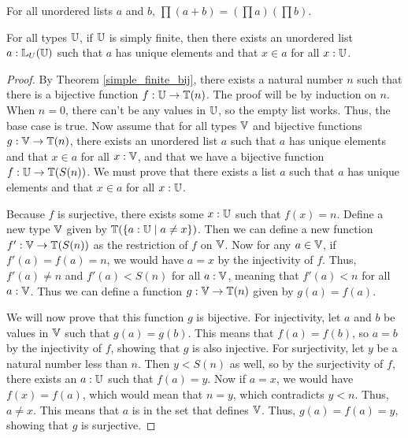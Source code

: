 \documentclass[../math.tex]{subfiles}
\begin{document}
\begin{theorem} \label{ulist_prod_conc}
    For all unordered lists $a$ and $b$, $\prod (a + b) = (\prod a) (\prod b)$.
\end{theorem}

\begin{theorem} \label{ulist_finite}
    For all types $\mathbb{U}$, if $\mathbb{U}$ is simply finite, then there exists an unordered
    list $a : \mathbb{L}_U(\mathbb{U})$ such that $a$ has unique elements and that $x \in a$ for
    all $x : \mathbb{U}$.
\end{theorem}
\begin{proof}
    By Theorem \ref{simple_finite_bij}, there exists a natural number $n$ such
    that there is a bijective function $f : \mathbb{U} \to \mathbb{T}(n)$.  The proof will be by
    induction on $n$.  When $n = 0$, there can't be any values in $\mathbb{U}$, so the
    empty list works.  Thus, the base case is true.  Now assume that for all
    types $\mathbb{V}$ and bijective functions $g : \mathbb{V} \to \mathbb{T}(n)$, there exists an
    unordered list $a$ such that $a$ has unique elements and that $x \in a$ for
    all $x : \mathbb{V}$, and that we have a bijective function $f : \mathbb{U} \to \mathbb{T}(S(n))$.
    We must prove that there exists a list $a$ such that $a$ has unique elements
    and that $x \in a$ for all $x : \mathbb{U}$.

    Because $f$ is surjective, there exists some $x : \mathbb{U}$ such that $f(x) = n$.
    Define a new type $\mathbb{V}$ given by $\mathbb{T}(\{a : \mathbb{U} \mid a \neq x\})$.  Then we can
    define a new function $f' : \mathbb{V} \to \mathbb{T}(S(n))$ as the restriction of $f$ on
    $\mathbb{V}$.  Now for any $a \in \mathbb{V}$, if $f'(a) = f(a) = n$, we would have $a = x$
    by the injectivity of $f$.  Thus, $f'(a) \neq n$ and $f'(a) < S(n)$ for all
    $a : \mathbb{V}$, meaning that $f'(a) < n$ for all $a : \mathbb{V}$.  Thus we can define a
    function $g : \mathbb{V} \to \mathbb{T}(n)$ given by $g(a) = f(a)$.

    We will now prove that this function $g$ is bijective.  For injectivity, let
    $a$ and $b$ be values in $\mathbb{V}$ such that $g(a) = g(b)$.  This means that
    $f(a) = f(b)$, so $a = b$ by the injectivity of $f$, showing that $g$ is
    also injective.  For surjectivity, let $y$ be a natural number less than
    $n$.  Then $y < S(n)$ as well, so by the surjectivity of $f$, there exists
    an $a : \mathbb{U}$ such that $f(a) = y$.  Now if $a = x$, we would have $f(x) =
    f(a)$, which would mean that $n = y$, which contradicts $y < n$.  Thus, $a
    \neq x$.  This means that $a$ is in the set that defines $\mathbb{V}$.  Thus, $g(a)
    = f(a) = y$, showing that $g$ is surjective.


\end{proof}
\end{document}
